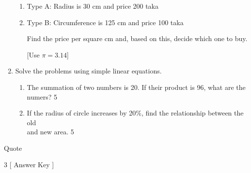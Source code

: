 \documentclass{exam}
\newcommand{\showallanswers}{\par\unvbox\allanswers}
\begin{document}
\begin{center}
\begin{enumerate}
  \begin{enumerate}

\item Type A: Radius is 30 cm and price 200 taka
\item Type B: Circumference is 125 cm and price 100 taka

Find the price per square cm and, based on this, decide which one to buy.

[Use $\pi = 3.14$]

\end{enumerate}

  
   \item Solve the problems using simple linear equations. 
  
  \begin{enumerate}
  
  \item The summation of two numbers is 20. If their product is 96, what are the
  numers? \hfill 5
  
  \item If the radius of circle increases by 20\%, find the relationship between
  the old \\ and new area. \hfill 5
  
  \end{enumerate}
  
  \end{enumerate}

\end{center}

 \vspace{2.5cm}

\begin{center}
Quote
\end{center}

\pagebreak
\bigskip

\begin{multicols}{3}
[
Answer Key
]
\showallanswers %
\end{multicols}
\end{document}
